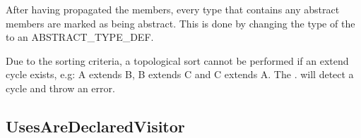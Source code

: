 After having propagated the members, every type that contains any abstract members are marked as being abstract. This is done by changing the type of the  to an ABSTRACT_TYPE_DEF.

Due to the sorting criteria, a topological sort cannot be performed if an extend cycle exists, e.g: A extends B, B extends C and C extends A. The . will detect a cycle and throw an error.

\subsection{UsesAreDeclaredVisitor}
\label{sec:usesaredeclaredvisitor}

